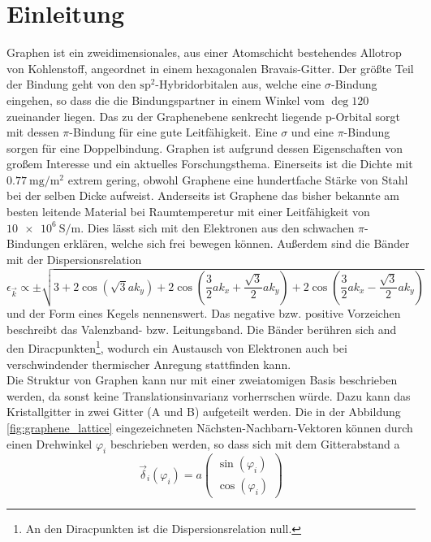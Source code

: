 \chapter{Einleitung}
Graphen ist ein zweidimensionales, aus einer Atomschicht bestehendes Allotrop von Kohlenstoff, angeordnet in einem hexagonalen
Bravais-Gitter. 
Der größte Teil der Bindung geht von den $\text{sp}^2$-Hybridorbitalen aus, welche eine $\sigma$-Bindung eingehen, so dass 
die die Bindungspartner in einem Winkel vom $\deg{120}$ zueinander liegen. 
Das zu der Graphenebene senkrecht liegende p-Orbital sorgt mit dessen $\pi$-Bindung für eine gute Leitfähigkeit.\cite{graphene_properties}
Eine $\sigma$ und eine $\pi$-Bindung sorgen für eine Doppelbindung.
Graphen ist aufgrund dessen Eigenschaften von großem Interesse und ein aktuelles Forschungsthema.
Einerseits ist die  Dichte mit $\qty{0.77}{\milli\gram\per\metre\squared}$ extrem gering, obwohl 
Graphene eine hundertfache Stärke von Stahl bei der selben Dicke aufweist. 
Anderseits ist Graphene das bisher bekannte am besten leitende Material bei Raumtemperetur mit einer Leitfähigkeit von 
$\qty{10e6}{\siemens\per\metre}$\cite{graphene_properties}. 
Dies lässt sich mit den Elektronen aus den schwachen $\pi$-Bindungen erklären, welche sich frei bewegen können.
Außerdem sind die Bänder mit der Dispersionsrelation
\begin{equation*}
    \epsilon_{\vec{k}} \propto \pm \sqrt{3+2\cos(\sqrt{3}ak_y)+2\cos(\frac{3}{2}ak_x+\frac{\sqrt{3}}{2}ak_y) + 2\cos(\frac{3}{2}ak_x-\frac{\sqrt{3}}{2}ak_y) }
\end{equation*}
und der Form eines Kegels nennenswert.
Das negative bzw. positive Vorzeichen beschreibt das Valenzband- bzw. Leitungsband. 
Die Bänder berühren sich and den Diracpunkten\footnote{An den Diracpunkten ist die Dispersionsrelation null.}, wodurch ein Austausch von Elektronen auch bei verschwindender thermischer Anregung 
stattfinden kann.\cite{graphene_properties}\\
Die Struktur von Graphen kann nur mit einer zweiatomigen Basis beschrieben werden, da sonst keine Translationsinvarianz vorherrschen würde.
Dazu kann das Kristallgitter in zwei Gitter (A und B) aufgeteilt werden.
Die in der Abbildung \ref{fig:graphene_lattice} eingezeichneten Nächsten-Nachbarn-Vektoren können durch einen Drehwinkel $\varphi_i$ beschrieben werden, so dass sich 
mit dem Gitterabstand a
\begin{equation*}
    \vec{\delta}_i(\varphi_i) = a\begin{pmatrix} \sin (\varphi_i) \\ \cos (\varphi_i)     \end{pmatrix}
\end{equation*}
